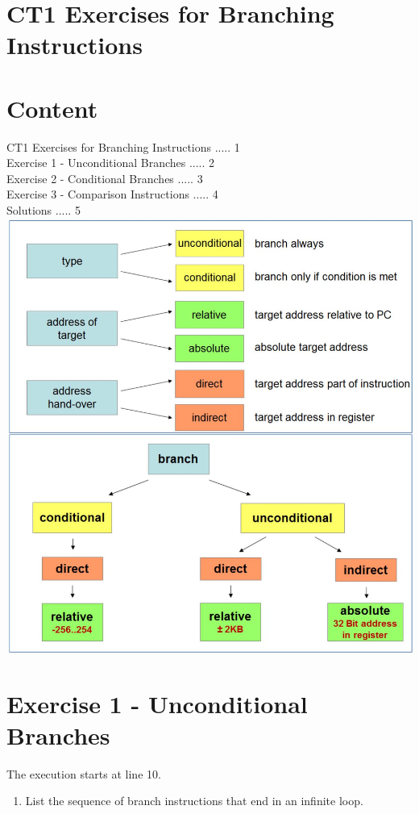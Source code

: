 \documentclass[10pt]{article}
\begin{document}
\section*{CT1 Exercises for Branching Instructions}
\section*{Content}
CT1 Exercises for Branching Instructions ..... 1\\
Exercise 1 - Unconditional Branches ..... 2\\
Exercise 2 - Conditional Branches ..... 3\\
Exercise 3 - Comparison Instructions ..... 4\\
Solutions ..... 5\\
\includegraphics[width=\linewidth]{images/2025_01_02_9902c2d2685de638ef73g-1}

\section*{Exercise 1 - Unconditional Branches}
The execution starts at line 10.

\begin{enumerate}
  \item List the sequence of branch instructions that end in an infinite loop.
\end{enumerate}
\end{document}
